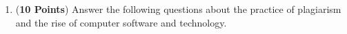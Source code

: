 \documentclass[12pt]{article}
\begin{document}
\begin{enumerate}




\newpage






\newpage

\item ({\bf 10 Points}) Answer the following questions about the
  practice of plagiarism and the rise of computer software and
  technology.


\end{enumerate}
\end{document}
